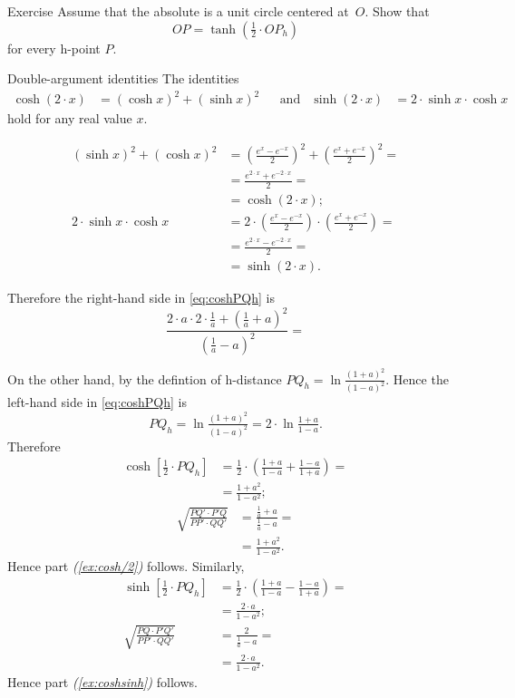 \begin{thm}{Exercise}\label{ex:O-h-dist}
Assume that the absolute is a unit circle centered at~$O$.
Show that
\[OP=\tanh(\tfrac12 \cdot OP_h)\]
for every h-point $P$.
\end{thm}

\begin{thm}{Double-argument identities}\label{double-argument}
The identities
\begin{align*}
\cosh (2\cdot x)&=(\cosh x)^2+(\sinh x)^2
&&\text{and}&
\sinh (2\cdot x)&=2\cdot\sinh x\cdot \cosh x
\end{align*}
hold for any real value $x$.
\end{thm}

\begin{align*}
(\sinh x)^2+(\cosh x)^2
&=(\tfrac{e^x-e^{-x}}2)^2+(\tfrac{e^x+e^{-x}}2)^2=
\\
&=\tfrac{e^{2\cdot x}+e^{-2\cdot x}}2=
\\
&=\cosh (2\cdot x);
\\
2\cdot\sinh x\cdot \cosh x
&=2\cdot(\tfrac{e^x-e^{-x}}2)\cdot(\tfrac{e^x+e^{-x}}2)=
\\
&=\tfrac{e^{2\cdot x}-e^{-2\cdot x}}2=
\\
&=\sinh (2\cdot x).
\end{align*}
\qedsf














Therefore the right-hand side in \ref{eq:coshPQh} is
\[\frac{2\cdot a\cdot2\cdot \tfrac1a+(\tfrac1a+a)^2}{(\tfrac1a-a)^2}=\]

On the other hand, by the defintion of h-distance $PQ_h=\ln \tfrac{(1+a)^2}{(1-a)^2}$.
Hence the left-hand side in \ref{eq:coshPQh} is
\[PQ_h=\ln \tfrac{(1+a)^2}{(1-a)^2}=2\cdot \ln \tfrac{1+a}{1-a}.\]
Therefore
\begin{align*}
\cosh[\tfrac12\cdot PQ_h]
&=\tfrac12\cdot(\tfrac{1+a}{1-a}+\tfrac{1-a}{1+a})=
\\
&=\tfrac{1+a^2}{1-a^2};
\end{align*}
\begin{align*}
\sqrt{\frac{PQ'\cdot P'Q}{PP'\cdot QQ'}}
&=\frac{\frac1a+a}{\frac1a-a}=
\\
&=\tfrac{1+a^2}{1-a^2}.
\end{align*}
Hence part \textit{(\ref{ex:cosh/2})} follows.
Similarly,
\begin{align*}
\sinh[\tfrac12\cdot PQ_h]
&=\tfrac12\cdot\left(\tfrac{1+a}{1-a}-\tfrac{1-a}{1+a}\right)=
\\
&=\tfrac{2\cdot a}{1-a^2};
\\
\sqrt{\frac{PQ\cdot P'Q'}{PP'\cdot QQ'}}
&=\frac{2}{\frac1a-a}=
\\
&=\tfrac{2\cdot a}{1-a^2}.
\end{align*}
Hence part \textit{(\ref{ex:coshsinh})} follows.

